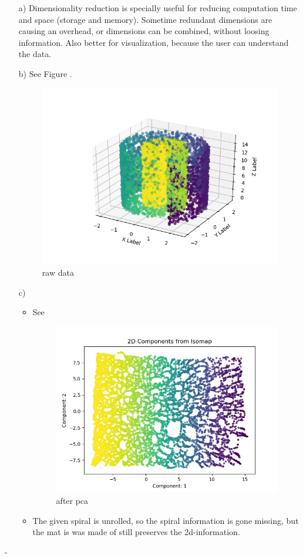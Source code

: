 \documentclass[a4paper]{article}
\begin{document}
\begin{enumerate}
	\item[a)]Dimensionality reduction is specially useful for reducing computation time and space (storage and memory). Sometime redundant dimensions are causing an overhead, or dimensions can be combined, without loosing information. Also better for visualization, because the user can understand the data.
	\item[b)] See Figure .
	\begin{figure}[!ht]
		\centering
		\includegraphics[width=0.7\linewidth]{swiss_roll}
		\caption{raw data}
		\label{fig:rawdata}
	\end{figure}
	\item[c)]
	\begin{itemize}
		\item See 
		
		\begin{figure}[!ht]
			\centering
			\includegraphics[width=0.7\linewidth]{swiss_roll_result}
			\caption{after pca}
			\label{fig:afterpca}
		\end{figure}
		\item The given spiral is unrolled, so the spiral information is gone missing, but the mat is was made of still preserves the 2d-information.
	\end{itemize}
	
\end{enumerate}



-
\end{document}
